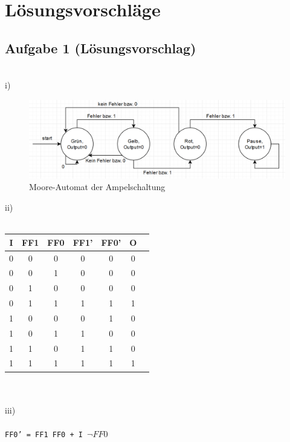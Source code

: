 \documentclass{article}
\begin{document}
\newpage

\section{Lösungsvorschläge}

\subsection{Aufgabe 1 (Lösungsvorschlag)} \\
i)
\begin{figure}[H]
\centering
\includegraphics[scale=0.45]{automat.png}
\caption{Moore-Automat der Ampelschaltung}
\end{figure}

ii) \\
\\
\begin{tabular}{c|c|c|c|c|c|c}
   I  & FF1 & FF0 & FF1' & FF0' & O \\
    \hline
   0   &  0   & 0   &   0   &   0   & 0  \\
    \hline
   0  &   0  &  1   &  0    &   0   &  0 \\
     \hline
   0  &  1   &  0   &   0   &   0   & 0  \\
     \hline
   0  &   1  &  1   &   1   &   1   & 1  \\
     \hline
   1  &  0   &  0   &   0   &   1   &  0 \\
     \hline
   1  &   0  &  1   &   1   &   0   &  0 \\
     \hline
   1  &  1   &  0   &   1   &   1   & 0  \\
     \hline
   1  &  1   &   1  &   1   &   1   &  1 \\
     \hline
\end{tabular} \\
 \\
iii) \\
\\
\texttt{FF0' = FF1 FF0 + I $\neg FF0$}
\label{sec:lsg01}
\end{document}
